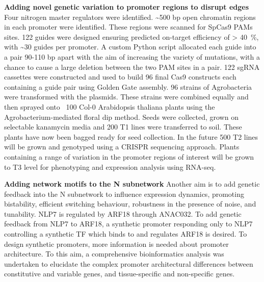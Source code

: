 \documentclass[../main.tex]{subfiles}
\begin{document}
\textbf{Adding novel genetic variation to promoter regions to disrupt edges}
Four nitrogen master regulators were identified. \textasciitilde{}500 bp open chromatin regions in each promoter were identified. These regions were scanned for SpCas9 PAMs sites. 122 guides were designed ensuring predicted on-target efficiency of \textgreater{} \SI{40}{\percent}, with \textasciitilde{}30 guides per promoter. A custom Python script allocated each guide into a pair 90-110 bp apart with the aim of increasing the variety of mutations, with a chance to cause a large deletion between the two PAM sites in a pair. 122 sgRNA cassettes were constructed and used to build 96 final Cas9 constructs each containing a guide pair using Golden Gate assembly. 96 strains of Agrobacteria were transformed with the plasmids. These strains were combined equally and then sprayed onto ~100 Col-0 Arabidopsis thaliana plants using the Agrobacterium-mediated floral dip method. Seeds were collected, grown on selectable kanamycin media and 200 T1 lines were transferred to soil. These plants have now been bagged ready for seed collection. In the future 500 T2 lines will be grown and genotyped using a CRISPR sequencing approach. Plants containing a range of variation in the promoter regions of interest will be grown to T3 level for phenotyping and expression analysis using RNA-seq.

\textbf{Adding network motifs to the N subnetwork}
Another aim is to add genetic feedback into the N subnetwork to influence expression dynamics, promoting bistability, efficient switching behaviour, robustness in the presence of noise, and tunability. NLP7 is regulated by ARF18 through ANAC032. To add genetic feedback from NLP7 to ARF18, a synthetic promoter responding only to NLP7 controlling a synthetic TF which binds to and regulates ARF18 is desired. To design synthetic promoters, more information is needed about promoter architecture. To this aim, a comprehensive bioinformatics analysis was undertaken to elucidate the complex promoter architectural differences between constitutive and variable genes, and tissue-specific and non-specific genes.
\end{document}
